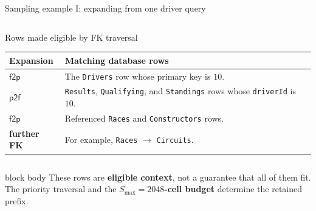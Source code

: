 \documentclass[aspectratio=169,10pt,t]{beamer}
\begin{document}
\begin{frame}{Sampling example I: expanding from one driver query}
\begin{columns}[c,onlytextwidth]
      \begin{block}{Rows made eligible by FK traversal}
        {\small
        \renewcommand{\arraystretch}{1.22}
        \setlength{\tabcolsep}{4pt}
        \begin{tabularx}{\linewidth}{>{\bfseries}l X}
          \toprule
          Expansion & Matching database rows \\
          \midrule
          $\mathsf{f2p}$
            & The \texttt{Drivers} row whose primary key is $10$. \\
          \rowcolor{PaleBlue}
          $\mathsf{p2f}$
            & \texttt{Results}, \texttt{Qualifying}, and \texttt{Standings} rows whose \texttt{driverId} is $10$. \\
          $\mathsf{f2p}$
            & Referenced \texttt{Races} and \texttt{Constructors} rows. \\
          \rowcolor{PaleBlue}
          further FK
            & For example, \texttt{Races} $\rightarrow$ \texttt{Circuits}. \\
          \bottomrule
        \end{tabularx}}
      \end{block}
  \end{columns}

  \vspace{.13cm}
  \begin{beamercolorbox}[sep=.52em,wd=\linewidth]{block body}
    \centering\small
    These rows are \textbf{eligible context}, not a guarantee that all of them fit.
    The priority traversal and the \textbf{$S_{\max}=2048$-cell budget} determine the retained prefix.
  \end{beamercolorbox}
\end{frame}
\end{document}
